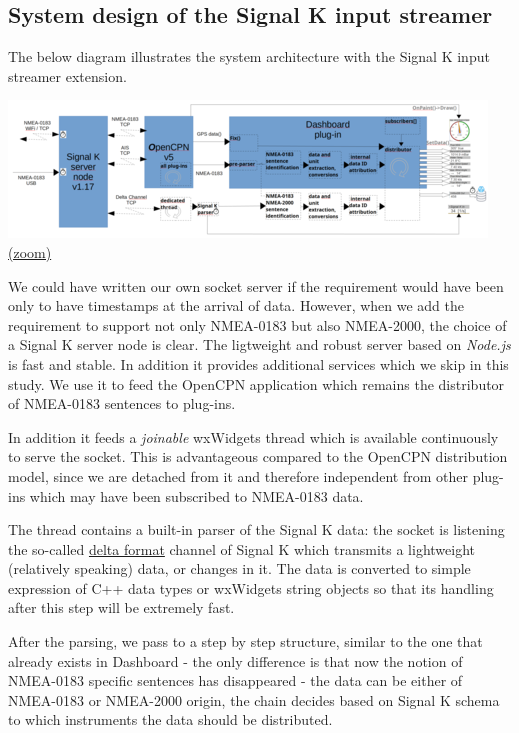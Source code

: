 \documentclass[11pt]{article}
\begin{document}
    \hypertarget{system-design-of-the-signal-k-input-streamer}{%
\subsection{System design of the Signal K input
streamer}\label{system-design-of-the-signal-k-input-streamer}}

    The below diagram illustrates the system architecture with the Signal K
input streamer extension.

    \includegraphics{signalkin-instrudiagram-3.png}
\href{img/signalkin-instrudiagram-3.png}{(zoom)}

    We could have written our own socket server if the requirement would
have been only to have timestamps at the arrival of data. However, when
we add the requirement to support not only NMEA-0183 but also NMEA-2000,
the choice of a Signal K server node is clear. The ligtweight and robust
server based on \emph{Node.js} is fast and stable. In addition it
provides additional services which we skip in this study. We use it to
feed the OpenCPN application which remains the distributor of NMEA-0183
sentences to plug-ins.

    In addition it feeds a \emph{joinable} wxWidgets thread which is
available continuously to serve the socket. This is advantageous
compared to the OpenCPN distribution model, since we are detached from
it and therefore independent from other plug-ins which may have been
subscribed to NMEA-0183 data.

    The thread contains a built-in parser of the Signal K data: the socket
is listening the so-called
\href{https://signalk.org/specification/1.3.0/doc/data_model.html\#delta-format}{delta
format} channel of Signal K which transmits a lightweight (relatively
speaking) data, or changes in it. The data is converted to simple
expression of C++ data types or wxWidgets string objects so that its
handling after this step will be extremely fast.

    After the parsing, we pass to a step by step structure, similar to the
one that already exists in Dashboard - the only difference is that now
the notion of NMEA-0183 specific sentences has disappeared - the data
can be either of NMEA-0183 or NMEA-2000 origin, the chain decides based
on Signal K schema to which instruments the data should be distributed.
\end{document}
